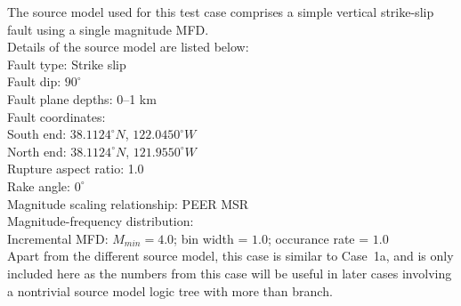 The source model used for this test case comprises a simple vertical strike-slip fault using a single magnitude MFD.\\

\noindent Details of the source model are listed below:\\

\noindent
Fault type: Strike slip\\
Fault dip: $90^{\circ}$\\
Fault plane depths: 0--1 km\\
Fault coordinates:\\
South end: $38.1124^{\circ} N$, $122.0450^{\circ} W$\\
North end: $38.1124^{\circ} N$, $121.9550^{\circ} W$\\
Rupture aspect ratio: 1.0\\
Rake angle: $0^{\circ}$\\
Magnitude scaling relationship: PEER MSR\\
Magnitude-frequency distribution:\\
Incremental MFD: $M_{min} = 4.0$; bin width = $1.0$; occurance rate = $1.0$\\

Apart from the different source model, this case is similar to Case~1a, and is only included here as the numbers from this case will be useful in later cases involving a nontrivial source model logic tree with more than branch.